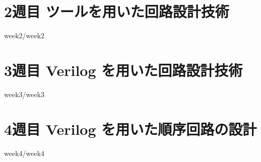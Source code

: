 \documentclass[12pt]{jreport}
\begin{document}

\newpage
\setcounter{page}{0}
\tableofcontents

\newpage
\setcounter{page}{1}


\chapter{2週目 ツールを用いた回路設計技術}
 {week2/week2}  

\chapter{3週目 Verilog を用いた回路設計技術}
 {week3/week3}  

\chapter{4週目 Verilog を用いた順序回路の設計}
 {week4/week4}
\end{document}
